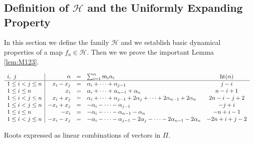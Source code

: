 \chapter{\MyChapThree}



\section{Definition of \texorpdfstring{$\mathcal{H}$}{H} and the Uniformly
  Expanding Property}
\label{sec:2-Uniformly}


In this section we define the family $\mathcal{H}$ and we establish basic
dynamical properties of a map $f_a\in \mathcal{H}.$ Then we we prove the
important Lemma \ref{lem:M123}.

\begin{table}[h!tb]
  \footnotesize {}
  \renewcommand{\arraystretch}{1.3}
  \begin{equation*}
    \begin{array}{l|rclc}
      i,\ j &\alpha&=&\sum_{i=1}^n m_i\alpha_i&{\operatorname{ht}}(\alpha)\\\hline
      1\leq i< j\leq n&  x_i-x_j& =& \alpha_{i}+ \dots +\alpha_{j-1}& j-i \\
      1\leq i\leq n& x_i&=& \alpha_i+\dots +\alpha_{n-1}+ \alpha_n &
      n-i+1\\ 
      1\leq i< j\leq n& x_i+x_j&=& \alpha_i+ \dots +\alpha_{j-1} + 2\alpha_j+
      \dots +2\alpha_{n-1} +2\alpha_n& 2n-i-j+2 \\ 
      1\leq i< j\leq n& - x_i+x_j& =& -\alpha_{i}- \dots -\alpha_{j-1}& -j+i \\
      1\leq i\leq n& -x_i &= &-\alpha_i-\dots -\alpha_{n-1}- \alpha_n &
      -n+i-1\\ 
      1\leq i< j\leq n&  -x_i-x_j&=& -\alpha_i- \dots -\alpha_{j-1} - 2\alpha_j-
      \dots -2\alpha_{n-1} -2\alpha_n& -2n+i+j-2   
    \end{array}  
  \end{equation*}
  \caption{Roots expressed as linear combinations of vectors in
    $\Pi$.}
  \label{tab:xxx} 
\end{table}


